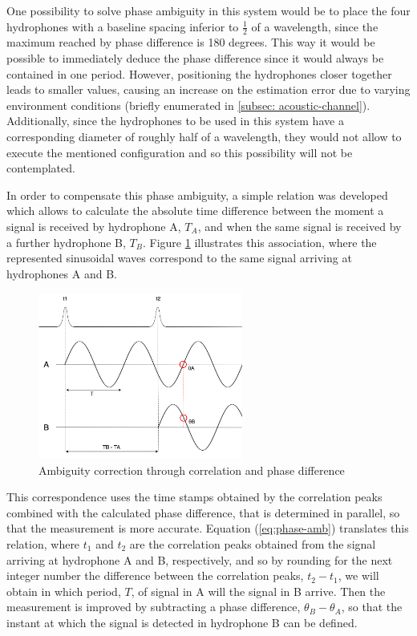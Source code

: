 One possibility to solve phase ambiguity in this system would be to place the four hydrophones with a baseline spacing inferior to $\frac{1}{2}$ of a wavelength, since the maximum reached by phase difference is 180 degrees. This way it would be possible to immediately deduce the phase difference since it would always be contained in one period. However, positioning the hydrophones closer together leads to smaller  values, causing an increase on the estimation error due to varying environment conditions (briefly enumerated in \ref{subsec: acoustic-channel}). Additionally, since the hydrophones to be used in this system have a corresponding diameter of roughly half of a wavelength, they would not allow to execute the mentioned configuration and so this possibility will not be contemplated.

In order to compensate this phase ambiguity, a simple relation was developed which allows to calculate the absolute time difference between the moment a signal is received by hydrophone A, $T_A$, and when the same signal is received by a further hydrophone B, $T_B$. Figure \ref{fig:ambiguity} illustrates this association, where the represented sinusoidal waves correspond to the same signal arriving at hydrophones A and B. 

\begin{figure}[!htbp]
	\centering
	\includegraphics[width=0.6\textwidth]{figures/ambiguity}
	\captionsetup{justification=centering,margin=2cm}
	\caption{Ambiguity correction through correlation and phase difference}
	\label{fig:ambiguity}
\end{figure}

This correspondence uses the time stamps obtained by the correlation peaks combined with the calculated phase difference, that is determined in parallel, so that the measurement is more accurate. Equation (\ref{eq:phase-amb}) translates this relation, where $t_1$ and $t_2$ are the correlation peaks obtained from the signal arriving at hydrophone A and B, respectively, and so by rounding for the next integer number the difference between the correlation peaks, $t_2 - t_1$, we will obtain in which period, $T$, of signal in A will the signal in B arrive. Then the measurement is improved by subtracting a phase difference, $\theta_B - \theta_A$, so that the instant at which the signal is detected in hydrophone B can be defined. 

